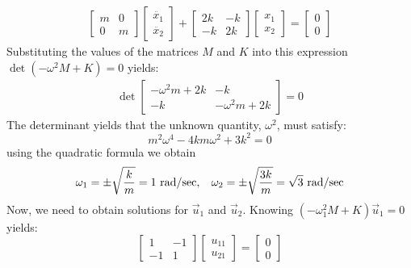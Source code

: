 \documentclass[12pt,letter]{article}
\begin{document}
\begin{example}
\begin{eqnarray}
		\begin{bmatrix} m & 0  \\  0 & m \end{bmatrix}\begin{bmatrix} \ddot{x_1} \\  \ddot{x_2} \end{bmatrix} + \begin{bmatrix} 2k & -k  \\  -k & 2k \end{bmatrix}\begin{bmatrix} x_1 \\  x_2 \end{bmatrix} = \begin{bmatrix} 0 \\  0 \end{bmatrix}
	\end{eqnarray}
	Substituting the values of the matrices $M$ and $K$ into this expression $\det(-\omega^2 M  + K) = 0$ yields: 
	\begin{eqnarray}
	\det\begin{bmatrix} -\omega^2 m + 2k & -k  \\  -k & -\omega^2 m + 2k \end{bmatrix}=0
	\end{eqnarray}
	The determinant yields that the unknown quantity, $\omega^2$, must satisfy:
	\begin{equation}
	m^2 \omega^4 - 4km\omega^2 + 3k^2 = 0
	\end{equation}
	using the quadratic formula we obtain
	\begin{equation}
	\omega_1 = \pm \sqrt{\frac{k}{m}}=1 \text{ rad/sec}, \hspace{2ex} \omega_2 = \pm \sqrt{\frac{3k}{m}}=\sqrt{3} \text{ rad/sec}
	\end{equation}
	Now, we need to obtain solutions for $\vec{u}_1$ and $\vec{u}_2$. Knowing $(-\omega_1^2 M  + K)\vec{u}_1 =0$ yields:
	\begin{equation}
		 \begin{bmatrix} 1 & -1 \\    -1  & 1 \end{bmatrix} 
		 \begin{bmatrix} u_{11}\\ u_{21}\end{bmatrix}=\begin{bmatrix} 0\\ 0\end{bmatrix}
	\end{equation}

\end{example}
\end{document}
